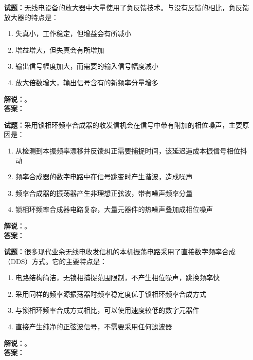 \documentclass{ctexbook}
\begin{document}
\vspace{\baselineskip}

\noindent\textbf{试题：}无线电设备的放大器中大量使用了负反馈技术。与没有反馈的相比，负反馈放大器的特点是：
\begin{enumerate}[leftmargin=3em]
  \item 失真小，工作稳定，但增益会有所减小
  \item 增益增大，但失真会有所增加
  \item 输出信号幅度加大，而需要的输入信号幅度减小
  \item 放大倍数增大，输出信号含有的新频率分量增多
\end{enumerate}
\noindent\textbf{解说：}\textbf{}。\\\noindent\textbf{答案：}

\vspace{\baselineskip}

\noindent\textbf{试题：}采用锁相环频率合成器的收发信机会在信号中带有附加的相位噪声，主要原因是：
\begin{enumerate}[leftmargin=3em]
  \item 从检测到本振频率漂移并反馈纠正需要捕捉时间，该延迟造成本振信号相位抖动
  \item 频率合成器的数字电路中在信号跳变时产生谐波，造成噪声
  \item 频率合成器的振荡器产生非理想正弦波，带有噪声频率分量
  \item 锁相环频率合成器电路复杂，大量元器件的热噪声叠加成相位噪声
\end{enumerate}
\noindent\textbf{解说：}\textbf{}。\\\noindent\textbf{答案：}

\vspace{\baselineskip}

\noindent\textbf{试题：}很多现代业余无线电收发信机的本机振荡电路采用了直接数字频率合成（DDS）方式。它的主要特点是：
\begin{enumerate}[leftmargin=3em]
  \item 电路结构简洁，无锁相捕捉范围限制，不产生相位噪声，跳换频率快
  \item 采用同样的频率源振荡器时频率稳定度优于锁相环频率合成方式
  \item 与锁相环频率合成方式相比，可以使用速度较低的数字元器件
  \item 直接产生纯净的正弦波信号，不需要采用任何滤波器
\end{enumerate}
\noindent\textbf{解说：}\textbf{}。\\\noindent\textbf{答案：}
\end{document}
